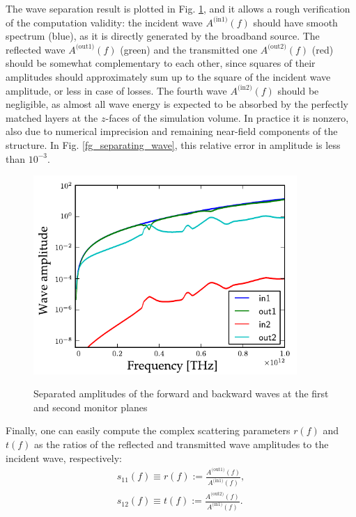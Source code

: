 The wave separation result is plotted in Fig. \ref{fg_ampli}, and it allows a rough verification of the computation validity: the incident wave $A^{\text{(in1)}}(f)$ should have smooth spectrum (blue), as it is directly generated by the broadband source. The reflected wave $A^{\text{(out1)}}(f)$ (green) and the transmitted one $A^{\text{(out2)}}(f)$ (red) should be somewhat complementary to each other, since squares of their amplitudes should approximately sum up to the square of the incident wave amplitude, or less in case of losses. The fourth wave $A^{\text{(in2)}}(f)$ should be negligible, as almost all wave energy is expected to be absorbed by the perfectly matched layers at the $z$-faces of the simulation volume. In practice it is nonzero, also due to numerical imprecision and remaining near-field components of the structure. In Fig. \ref{fg_separating_wave}, this relative error in amplitude is less than $10^{-3}$.
\begin{figure}[ht] \caption{Separated amplitudes of the forward and backward waves at the first and second monitor planes}  \centering \includegraphics[width=10cm]{img/sim_ampli_debug_band.pdf}\label{fg_ampli} \end{figure} 

Finally, one can easily compute the complex scattering parameters $r(f)$ and $t(f)$ as the ratios of the reflected and transmitted wave amplitudes to the incident wave, respectively:
\begin{equation} 
	\begin{split}
		s_{11}(f) \equiv r(f) := \frac{A^{\text{(out1)}}(f)}{A^{\text{(in1)}}(f)},\\
		s_{12}(f) \equiv t(f) := \frac{A^{\text{(out2)}}(f)}{A^{\text{(in1)}}(f)}.
	\end{split}
\label{eq_sparam}\end{equation}

